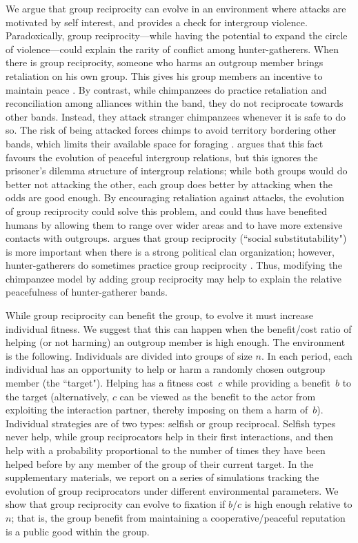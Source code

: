 \documentclass[12pt,a4paper]{article}\usepackage[]{graphicx}\usepackage[]{color}
\begin{document}
We argue that group reciprocity can evolve in an environment where attacks are motivated by self interest, and provides 
a check for intergroup violence. Paradoxically, group reciprocity---while having the potential to expand the circle of 
violence---could explain the rarity of conflict among hunter-gather\-ers.
When there is group reciprocity, someone who harms an outgroup member brings retaliation on his own group. This gives 
his group members an incentive to maintain peace \citep{boehm1984blood}. By contrast, while 
chimpanzees do practice retaliation and reconciliation among alliances within the band, they  do not reciprocate towards 
other bands. Instead, they attack stranger chimpanzees whenever it is safe to do so. The risk of being attacked forces chimps
to avoid territory bordering other bands, which limits their available space for foraging \citep{wilson2003intergroup}.
\citet{kelly2005evolution} argues that this fact favours the evolution of peaceful intergroup relations, but this ignores
the prisoner's dilemma structure of intergroup relations; while both groups would
do better not attacking the other, each group does better by attacking when the odds are good enough.
By encouraging retaliation against attacks, the evolution of group reciprocity could solve this problem, and could thus
have benefited humans by allowing them to range over wider areas and to have more 
extensive contacts with outgroups. \citet{kelly2000warless} argues that group reciprocity (``social substitutability") is
more important when there is a strong political clan organization; however, hunter-gatherers do sometimes practice group 
reciprocity \citep{boehm2012ancestral}. Thus, modifying the chimpanzee model by adding group reciprocity may help to 
explain the relative peacefulness of hunter-gatherer bands. 

While group reciprocity can benefit the group, to evolve it must increase individual fitness. We suggest that this can
happen when the benefit/cost ratio of helping (or not harming) an outgroup member is high enough. The environment is the
following. Individuals are divided into groups of size $n$. In each period, each individual has an opportunity to help or
harm a randomly chosen outgroup member (the ``target"). Helping has a fitness cost~$c$ while providing a benefit~$b$ to 
the target (alternatively, $c$ can be viewed as the benefit to the actor from exploiting the interaction partner, thereby
imposing on them a harm of~$b$). Individual strategies are of two types: selfish or group reciprocal.
Selfish types never help, while group reciprocators help in their first interactions, and then help with a probability
proportional to the number of times they have been helped before by any member of the group of their current target. In the
supplementary materials, we report on a series of simulations tracking the evolution of group reciprocators under different
environmental parameters. We show that group reciprocity can evolve to fixation if $b/c$ is high enough relative to $n$; 
that is, the group benefit from maintaining a cooperative/peaceful reputation is a public good within the group. 
\end{document}
